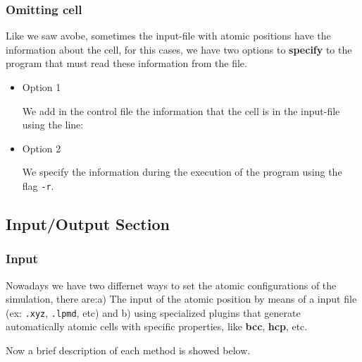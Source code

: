 \subsubsection{Omitting cell}

Like we saw avobe, sometimes the input-file with atomic positions have the
information about the cell, for this cases, we have two options to
\textbf{specify} to the program that must read these information from the file.

\begin{itemize} 
\item{Option 1}

We add in the control file the information that the cell is in the input-file
using the line:


\item{Option 2}

We specify the information during the execution of the program using the flag
\verb|-r|.


\end{itemize}

\subsection{Input/Output Section}

\subsubsection{Input}

Nowadays we have two differnet ways to set the atomic configurations of the
simulation, there are:a) The input of the atomic position by means of a input
file (ex: \verb|.xyz|, \verb|.lpmd|, etc) and b) using specialized plugins that
generate automatically atomic cells with specific properties, like
\textbf{bcc}, \textbf{hcp}, etc.

Now a brief description of each method is showed below.

